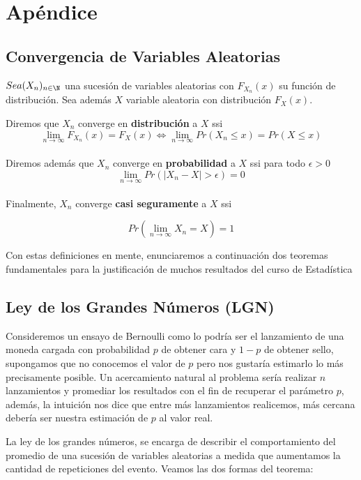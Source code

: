 \chapter{Apéndice}

\section{Convergencia de Variables Aleatorias}
$Sea (X_n)_{n \in \N}$ una sucesión de variables aleatorias con  $F_{X_n}(x)$ su función de distribución. Sea además $X$ variable aleatoria con distribución $F_{X}(x)$. 

\begin{definition}[Convergencia]
Diremos que $X_n$ converge en \textbf{distribución} a $X$ ssi
\[ \lim_{n \rightarrow \infty}F_{X_n}(x) = F_{X}(x) \Leftrightarrow \lim_{n \rightarrow \infty}Pr(X_n \leq x) = Pr(X \leq x)  \] 
\\
Diremos además que $X_n$ converge en \textbf{probabilidad} a $X$ ssi para todo $\epsilon > 0$
\[ \lim_{n \rightarrow \infty} Pr( |X_n - X | > \epsilon)=0 \]
\\
Finalmente, $X_n$ converge \textbf{casi seguramente} a $X$ ssi

\[  
Pr( \lim_{n \rightarrow \infty}X_n  = X ) = 1 
\] 



\end{definition}

Con estas definiciones en mente, enunciaremos a continuación dos teoremas fundamentales para la justificación de muchos resultados del curso de Estadística

\section{Ley de los Grandes Números (LGN)}
Consideremos un ensayo de Bernoulli como lo podría ser el lanzamiento de una moneda cargada con probabilidad $p$ de obtener cara y $1-p$ de obtener sello, supongamos que no conocemos el valor de $p$ pero nos gustaría estimarlo lo más precisamente posible. Un acercamiento natural al problema sería realizar $n$ lanzamientos y promediar los resultados con el fin de recuperar el parámetro $p$, además, la intuición nos dice que entre más lanzamientos realicemos, más cercana debería ser nuestra estimación de $p$ al valor real.

La ley de los grandes números, se encarga de describir el comportamiento del promedio de una sucesión de variables aleatorias a medida que aumentamos la cantidad de repeticiones del evento. Veamos las dos formas del teorema:

